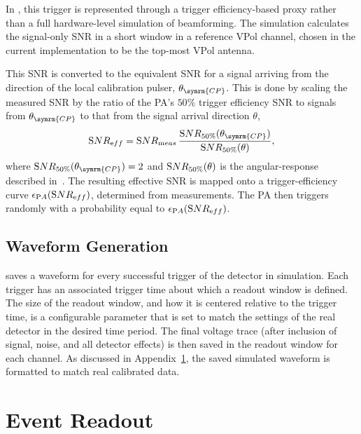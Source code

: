         In \arasim{}, this trigger is represented through a trigger efficiency-based proxy rather than a full hardware-level simulation of beamforming.
        The simulation calculates the signal-only SNR in a short window in a reference VPol channel, chosen in the current implementation to be the top-most VPol antenna.

        This SNR is converted to the equivalent SNR for a signal arriving from the direction of the local calibration pulser, $\theta_{\symrm{CP}}$.
        This is done by scaling the measured SNR by the ratio of the PA's $50\%$ trigger efficiency SNR to signals from $\theta_{\symrm{CP}}$ to that from the signal arrival direction $\theta$,
        \begin{equation}
        {\textrm SNR}_{\textrm eff} = {\textrm SNR}_{\textrm meas}\, \frac{{\textrm SNR}_{50\%}(\theta_{\symrm{CP}})}{{\textrm SNR}_{50\%}(\theta)},
        \end{equation}
        where ${\textrm SNR}_{50\%}(\theta_{\symrm{CP}})=2$ and ${\textrm SNR}_{50\%}(\theta)$ is the angular-response described in~\citep{ara_pa_design}.
        The resulting effective SNR is mapped onto a trigger-efficiency curve $ \epsilon_{\textrm PA}({\textrm SNR}_{\textrm eff})$, determined from measurements.
        The PA then triggers randomly with a probability equal to $\epsilon_{\textrm PA}({\textrm SNR}_{\textrm eff})$.

        \subsection{Waveform Generation}

        \arasim{} saves a waveform for every successful trigger of the detector in simulation.
        Each trigger has an associated trigger time about which a readout window is defined.
        The size of the readout window, and how it is centered relative to the trigger time, is a configurable parameter that is set to match the settings of the real detector in the desired time period.
        The final voltage trace (after inclusion of signal, noise, and all detector effects) is then saved in the readout window for each channel.
        As discussed in Appendix~\ref{app:event_readout}, the saved simulated waveform is formatted to match real calibrated data.
    
    \section{Event Readout}\label{app:event_readout}


